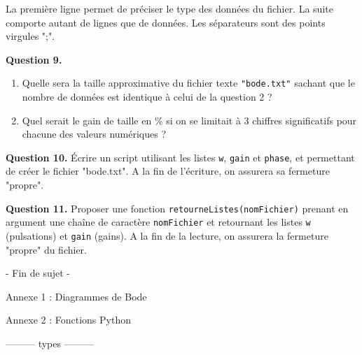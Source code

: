 \documentclass[11pt,fleqn]{book} %
\begin{document}
\begin{remark}
La première ligne permet de préciser le type des données du fichier.
La suite comporte autant de lignes que de données. Les séparateurs sont des points virgules ";".
\end{remark}

\begin{tBox}
\textbf{Question 9.}
\begin{enumerate}
\item Quelle sera la taille approximative du fichier texte \texttt{"bode.txt"} sachant que le nombre de données est identique à celui de la question 2 ?
\item Quel serait le gain de taille en \% si on se limitait à 3 chiffres significatifs pour chacune des valeurs numériques ?
\end{enumerate}
\end{tBox}

\begin{tBox}
\textbf{Question 10.} Écrire un script utilisant les listes \texttt{w}, \texttt{gain} et \texttt{phase}, et permettant de créer le fichier "bode.txt". A la fin de l'écriture, on assurera sa fermeture "propre".
\end{tBox}

\begin{tBox}
\textbf{Question 11.} Proposer une fonction \texttt{retourneListes(nomFichier)} prenant en argument une chaîne de caractère \texttt{nomFichier} et retournant les listes \texttt{w} (pulsations) et \texttt{gain} (gains). A la fin de la lecture, on assurera la fermeture "propre" du fichier.
\end{tBox}

\vspace{3 cm}

\begin{center}
- Fin de sujet -
\end{center}

\vfill


\pagebreak
\begin{center}
\huge{Annexe 1 : Diagrammes de Bode}
\end{center}


\vfill

\pagebreak
\begin{center}
\huge{Annexe 2 : Fonctions Python}
\end{center}

\begin{center}
--------- types ---------
\end{center}
\end{document}
